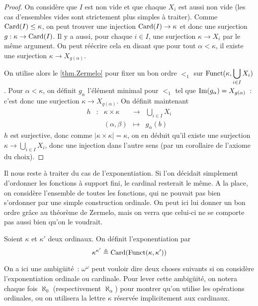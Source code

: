 \begin{proof}
  On considère que $I$ est non vide et que chaque $X_i$ est aussi non vide
  (les cas d'ensembles vides sont strictement plus simples à traiter). Comme
  $\operatorname{Card}(I) \leq \kappa$, on peut trouver une injection $\operatorname{Card}(I) \to \kappa$
  et donc une surjection $g : \kappa \to \operatorname{Card}(I)$. Il y a aussi, pour chaque
  $i \in I$, une surjection $\kappa \to X_i$ par le même argument. On peut
  réécrire cela en disant que pour tout $\alpha < \kappa$, il existe une
  surjection $\kappa \to X_{g(\alpha)}$.

  On utilise alors le \cref{thm.Zermelo} pour fixer un bon ordre $<_1$ sur
  $\displaystyle\operatorname{Funct}(\kappa,\bigcup_{i \in I} X_i)$. Pour $\alpha < \kappa$,
  on définit $g_\alpha$ l'élément minimal pour $<_1$ tel que
  $\operatorname{Im}(g_\alpha) = X_{g(\alpha)}$~: c'est donc une surjection
  $\kappa\to X_{g(\alpha)}$. On définit maintenant
  \[\begin{array}{ccccc}
  h & : & \kappa \times \kappa & \longrightarrow & \bigcup_{i \in I} X_i\\
  & & (\alpha, \beta) &\longmapsto & g_\alpha(b)
  \end{array}\]
  $h$ est surjective, donc comme $|\kappa \times \kappa| = \kappa$, on en
  déduit qu'il existe une surjection
  $\displaystyle\kappa \to \bigcup_{i \in I} X_i$, donc une injection dans l'autre
  sens (par un corollaire de l'axiome du choix).
\end{proof}

Il nous reste à traiter du cas de l'exponentiation. Si l'on décidait simplement
d'ordonner les fonctions à support fini, le cardinal resterait le même. A la
place, on considère l'ensemble de toutes les fonctions, qui ne pouvait pas
bien s'ordonner par une simple construction ordinale. On peut ici lui donner
un bon ordre grâce au théorème de Zermelo, mais on verra que celui-ci ne se
comporte pas aussi bien qu'on le voudrait.

\begin{definition}
  Soient $\kappa$ et $\kappa'$ deux ordinaux. On définit l'exponentiation
  par
  \[\kappa^{\kappa'} \triangleq \operatorname{Card}(\operatorname{Funct}(\kappa,\kappa'))\]
\end{definition}

\begin{notation}
  On a ici une ambigüité~: $\omega^\omega$ peut vouloir dire deux choses
  suivants si on considère l'exponentiation ordinale ou cardinale. Pour lever
  cette ambigüité, on notera chaque fois $\aleph_0$ (respectivement
  $\aleph_\alpha$) pour montrer qu'on utilise les opérations ordinales, ou on
  utilisera la lettre $\kappa$ réservée implicitement aux cardinaux.
\end{notation}


